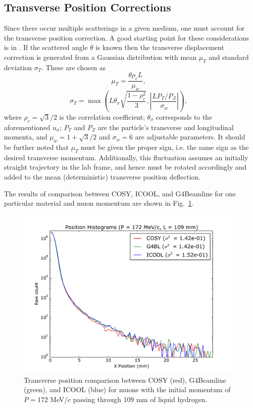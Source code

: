 \documentclass[a4paper,11pt]{article}
\begin{document}
\subsection{Transverse Position Corrections}
Since there occur multiple scatterings in a given medium, one must account for the transverse position correction. A good starting point for these considerations is in \cite{PDG}. If the scattered angle $\theta$ is known then the transverse displacement correction is generated from a Gaussian distribution with mean $\mu_T$ and standard deviation $\sigma_T$. These are chosen as 
\[
\mu_T = \frac{\theta \rho_c L}{\mu_w},
\]
\[
\sigma_T = \max\left(L \theta_\sigma \sqrt{\frac{1-\rho_c^2}{3}},\left|\frac{L P_T / P_Z}{\sigma_w}\right|\right),
\]
where $\rho_c = \sqrt{3}/2$ is the correlation coefficient; $\theta_\sigma$ corresponds to the aforementioned $u_\sigma$; $P_T$ and $P_Z$ are the particle's transverse and longitudinal momenta, and $\mu_w=1+\sqrt{3}/2$ and $\sigma_w=6$ are adjustable parameters. It should be further noted that $\mu_T$ must be given the proper sign, i.e. the same sign as the desired transverse momentum. Additionally, this fluctuation assumes an initially straight trajectory in the lab frame, and hence must be rotated accordingly and added to the mean (deterministic) transverse position deflection.

The results of comparison between COSY, ICOOL, and G4Beamline for one particular material and muon momentum are shown in Fig.~\ref{fig:transverse}.

\begin{figure}[htb]
\centering
\includegraphics[width=\columnwidth]{transverse.pdf}
\caption{Transverse position comparison between COSY (red), G4Beamline (green), and ICOOL (blue) for muons with the initial momentum of $P=172$ MeV/$c$ passing through 109 mm of liquid hydrogen.}
\label{fig:transverse}
\end{figure}
\end{document}
